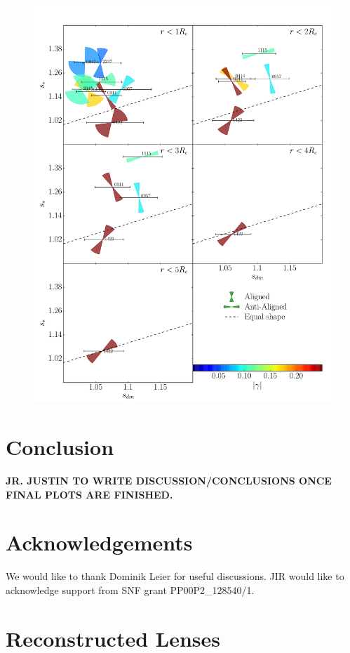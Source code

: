 \documentclass[useAMS,usenatbib]{mn2e}
\begin{document}
\begin{figure}
  \centering
  \includegraphics[width=.8\linewidth]{Figures/wedges.pdf}
  \caption[width=.65\linewidth]{}
  \label{fig:wedgesall}
\end{figure}


\section{Conclusion}\label{sec:conclusions}

{\bf JR. JUSTIN TO WRITE DISCUSSION/CONCLUSIONS ONCE FINAL PLOTS ARE FINISHED.} 



\section{Acknowledgements}\label{sec:acknowledgements}
We would like to thank Dominik Leier for useful discussions. JIR would like to acknowledge support from SNF grant PP00P2\_128540/1.




\appendix
\section{Reconstructed Lenses}\label{sec:reconstructions}
\end{document}
